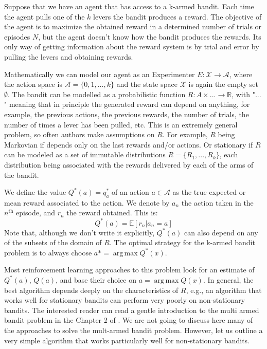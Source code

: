 \documentclass[11pt,a4paper,twoside]{report}
\DeclareMathOperator*{\argmax}{arg\,max}
\newcommand{\+}{\textnormal{+} }
\theoremstyle{definition}
\numberwithin{equation}{chapter}
\begin{document}
Suppose that we have an agent that has access to a k-armed bandit. Each time the agent pulls
one of the $k$ levers the bandit produces a reward. The objective
of the agent is to maximize the obtained reward in a determined number of 
trials or episodes $N$, but the agent doesn't know how the bandit produces 
the rewards. Its only way of getting information about the reward system is 
by trial and error by pulling the levers and obtaining rewards.

Mathematically we can model our agent as an Experimenter 
$E:\mathcal{X}\rightarrow\mathcal{A}$, where the action space is 
$\mathcal{A}=\{0,1,...,k\}$ and the state space $\mathcal{X}$ is again the 
empty set $\emptyset$. The bandit can be modelled as a probabilistic
function $R:A\times ... \rightarrow \mathbb{R}$, with "$...$" meaning that
in principle the generated reward can depend on anything, for example, the
previous actions, the previous rewards, the number of trials, the number
of times a lever has been pulled, etc. This is an extremely general problem,
so often authors make assumptions on $R$. For example, $R$ being Markovian if
depends only on the last rewards and/or actions. Or stationary if 
$R$ can be modeled as a set of immutable distributions $R=\{R_1,... , R_k\}$, 
each distribution being associated with the rewards delivered by each of the 
arms of the bandit.

We define the value $Q^*(a)=q^*_a$ of an action $a \in \mathcal{A}$ as the true
expected or mean reward associated to the action. We denote by $a_n$ the action
taken in the $n^\text{th}$ episode, and $r_n$ the reward obtained. This is:
\begin{equation}
  Q^*(a) = \mathbb{E}[r_n|a_n = a]
\end{equation}
Note that, although we don't write it explicitly, $Q^*(a)$ can also depend on 
any of the subsets of the domain of $R$.
The optimal strategy for the k-armed bandit problem is to always choose 
$a*=\argmax Q^*(x)$.

Most reinforcement learning approaches to this problem look for an estimate of
$Q^*(a)$, $Q(a)$, and base their choice on $a=\argmax Q(x)$. In general, the
best algorithm depends deeply on the characteristics of $R$, e.g., an algorithm
that works well for stationary bandits can perform very poorly on non-stationary
bandits. The interested reader can read a gentle introduction to the multi armed
bandit problem in the Chapter 2 of \cite{sutton2018reinforcement}. We are not
going to discuss here many of the approaches to solve the mult-armed bandit
problem. However, let us outline a very simple algorithm that works particularly
well for non-stationary bandits. 
\end{document}
